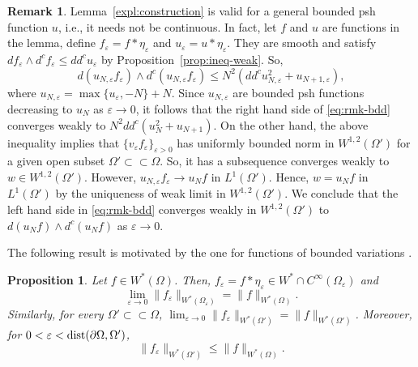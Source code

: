 \documentclass{amsart}
\renewcommand{\d}{\partial}
\newcommand{\veps}{\varepsilon}
\newcommand{\Om}{\Omega}
\newtheorem{prop}[thm]{Proposition}
\theoremstyle{definition}
\newtheorem{remark}[thm]{Remark}
\numberwithin{thm}{section}
\numberwithin{equation}{section}
\renewcommand{\[}{\begin{equation}}
\renewcommand{\]}{\end{equation}}
\newcommand{\wed}{\wedge}
\begin{document}
\begin{remark} \label{rmk:general-construction} Lemma~\ref{expl:construction} is valid for a general bounded psh function $u$, i.e., it needs not be continuous. In fact, let $f$ and $u$ are functions in the lemma, define $f_\veps=f*\eta_\veps$ and $u_\veps = u*\eta_\veps$. They are smooth and satisfy $df_\veps \wed d^c f_\veps \leq dd^c u_\veps$ by Proposition~\ref{prop:ineq-weak}. So, 
\[\label{eq:rmk-bdd}
	d (u_{N,\veps} f_\veps) \wed d^c (u_{N,\veps} f_\veps) \leq N^2 (dd^c u_{N,\veps}^2 + u_{N+1,\veps}),
\]
where $u_{N,\veps} = \max\{u_\veps, -N\} +N$. Since  $u_{N,\veps}$  are bounded psh functions decreasing to $u_N$ as $\veps \to 0$, it follows that the right hand side of \eqref{eq:rmk-bdd} converges weakly to $N^2 dd^c(u_N^2 + u_{N+1})$. On the other hand, the above inequality implies that   $\{v_\veps f_\veps\}_{\veps>0}$ has uniformly bounded norm  in $ W^{1,2} (\Om')$ for a given open subset $\Om'\subset \subset \Om$. So, it has a subsequence converges weakly to $w \in W^{1,2}(\Om')$. However, $u_{N,\veps} f_\veps \to u_N f$ in $L^1(\Om')$. Hence, $w = u_Nf$ in $L^1(\Om')$ by the uniqueness of weak limit in $W^{1,2}(\Om')$. We conclude that the left hand side in \eqref{eq:rmk-bdd}  converges weakly in $W^{1,2}(\Om')$ to $d(u_Nf) \wed d^c(u_Nf)$ as $\veps\to 0$.
\end{remark}

The following result is motivated by the one for functions of bounded variations \cite[Chapter~5]{EG92}.

\begin{prop}\label{prop:smoothing} Let $f \in W^*(\Om)$. Then,
$ f_\veps = f*\eta_\veps \in W^* \cap C^\infty(\Om_\veps)$ and 
$$\lim_{\veps\to 0}\|f_\veps\|_{W^*(\Om_\veps)} = \|f\|_{W^*(\Om)}.$$
Similarly, for every $\Om'\subset\subset \Om$, $\lim_{\veps \to 0} \|f_\veps\|_{W^*(\Om')} = \|f\|_{W^*(\Om')}$. Moreover, for $0< \veps < {\rm dist}(\d\Om, \Om')$,  $$\|f_\veps\|_{W^*(\Om')} \leq \|f\|_{W^*(\Om)}.$$
\end{prop}
\end{document}
